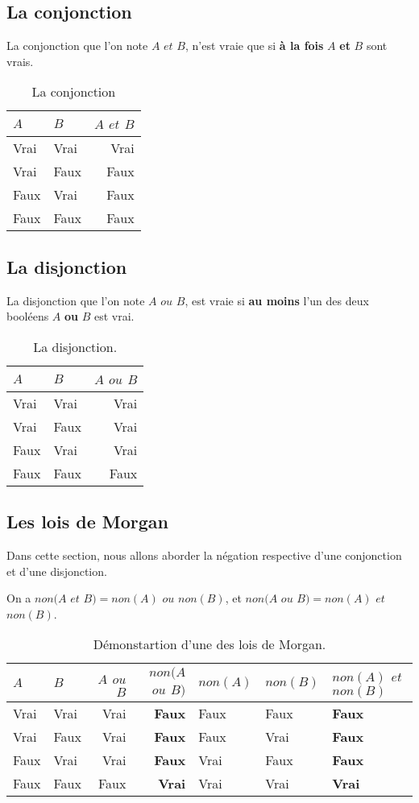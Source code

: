\subsection{La conjonction}
La conjonction que l'on note $A$ $et$ $B$, n'est vraie que si \textbf{à la fois} $A$ \textbf{et} $B$ sont vrais.
\begin{table}[h]
\centering
\begin{tabu} spread \linewidth {|l|l|r|}
\hline
$A$ & $B$ & $A$ $et$ $B$ \\ \hline
Vrai & Vrai & Vrai \\ \hline
Vrai & Faux & Faux \\ \hline
Faux & Vrai & Faux \\ \hline
Faux & Faux & Faux \\ \hline
\end{tabu}
\caption{La conjonction}
\end{table}
\subsection{La disjonction}
La disjonction que l'on note $A$ $ou$ $B$, est vraie si \textbf{au moins} l'un des deux booléens $A$ \textbf{ou} $B$ est vrai.
\begin{table}[h]
\centering
\begin{tabu} spread \linewidth {|l|l|r|}
\hline
$A$ & $B$ & $A$ $ou$ $B$ \\ \hline
Vrai & Vrai & Vrai \\ \hline
Vrai & Faux & Vrai \\ \hline
Faux & Vrai & Vrai \\ \hline
Faux & Faux & Faux \\ \hline
\end{tabu}
\caption{La disjonction.}
\end{table}
\subsection{Les lois de Morgan}
Dans cette section, nous allons aborder la négation respective d'une conjonction et d'une disjonction.

On a $non(A$ $et$ $B) = non(A)$ $ou$ $non(B)$,
et $non(A$ $ou$ $B) = non(A)$ $et$ $non(B)$.

\begin{table}[h]
\centering
\begin{tabu} spread \linewidth {|l|l|r|r|}
\hline
$A$ & $B$ & $A$ $ou$ $B$ & $non(A$ $ou$ $B)$ & $non(A)$ & $non(B)$ & $non(A)$ $et$ $non(B)$\\ \hline
Vrai & Vrai & Vrai & \textbf{Faux} & Faux & Faux & \textbf{Faux} \\ \hline
Vrai & Faux & Vrai & \textbf{Faux} & Faux & Vrai & \textbf{Faux} \\ \hline
Faux & Vrai & Vrai & \textbf{Faux} & Vrai & Faux & \textbf{Faux} \\ \hline
Faux & Faux & Faux & \textbf{Vrai} & Vrai & Vrai & \textbf{Vrai} \\ \hline
\end{tabu}
\caption{Démonstartion d'une des lois de Morgan.}
\end{table}


